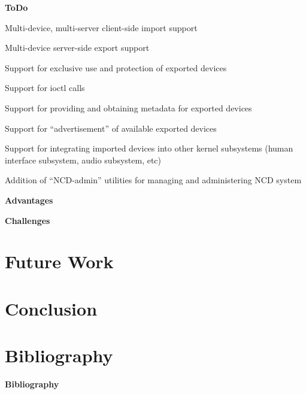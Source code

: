\documentclass[xcolor=dvipsnames]{beamer}
\newenvironment{packed_item}{
\begin{itemize}
  \setlength{\itemsep}{1pt}
  \setlength{\parskip}{0pt}
  \setlength{\parsep}{0pt}
}{\end{itemize}}
\begin{document}
\begin{frame}{\bf ToDo}

\begin{packed_item}
\item Multi-device, multi-server client-side import support
\item Multi-device server-side export support
\item Support for exclusive use and protection of exported devices
\item Support for ioctl calls
\item Support for providing and obtaining metadata for exported
  devices
\item Support for ``advertisement'' of available exported devices
\item Support for integrating imported devices into other kernel
  subsystems (human interface subsystem, audio subsystem, etc)
\item Addition of ``NCD-admin'' utilities for managing and administering
  NCD system
\end{packed_item}

\end{frame}

\begin{frame}{\bf Advantages}

\end{frame}

\begin{frame}{\bf Challenges}

\end{frame}

\section{Future Work}

\section{Conclusion}

\section{Bibliography}
\begin{frame}{\bf Bibliography}



\end{frame}
\end{document}
